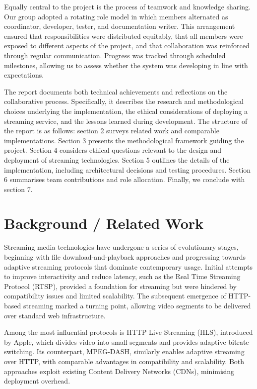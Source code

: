 \documentclass[11pt]{article}
\begin{document}
Equally central to the project is the process of teamwork and knowledge sharing. Our group adopted a rotating role model in which members alternated as coordinator, developer, tester, and documentation writer. This arrangement ensured that responsibilities were distributed equitably, that all members were exposed to different aspects of the project, and that collaboration was reinforced through regular communication. Progress was tracked through scheduled milestones, allowing us to assess whether the system was developing in line with expectations.

The report documents both technical achievements and reflections on the collaborative process. Specifically, it describes the research and methodological choices underlying the implementation, the ethical considerations of deploying a streaming service, and the lessons learned during development. The structure of the report is as follows: section 2 surveys related work and comparable implementations. Section 3 presents the methodological framework guiding the project. Section 4 considers ethical questions relevant to the design and deployment of streaming technologies. Section 5 outlines the details of the implementation, including architectural decisions and testing procedures. Section 6 summarises team contributions and role allocation. Finally, we conclude with section 7.

\section{Background / Related Work}
Streaming media technologies have undergone a series of evolutionary stages, beginning with file download-and-playback approaches and progressing towards adaptive streaming protocols that dominate contemporary usage. Initial attempts to improve interactivity and reduce latency, such as the Real Time Streaming Protocol (RTSP), provided a foundation for streaming but were hindered by compatibility issues and limited scalability. The subsequent emergence of HTTP-based streaming marked a turning point, allowing video segments to be delivered over standard web infrastructure.

Among the most influential protocols is HTTP Live Streaming (HLS)\cite{apple_hls}, introduced by Apple, which divides video into small segments and provides adaptive bitrate switching. Its counterpart, MPEG-DASH, similarly enables adaptive streaming over HTTP, with comparable advantages in compatibility and scalability. Both approaches exploit existing Content Delivery Networks (CDNs), minimising deployment overhead.
\end{document}
